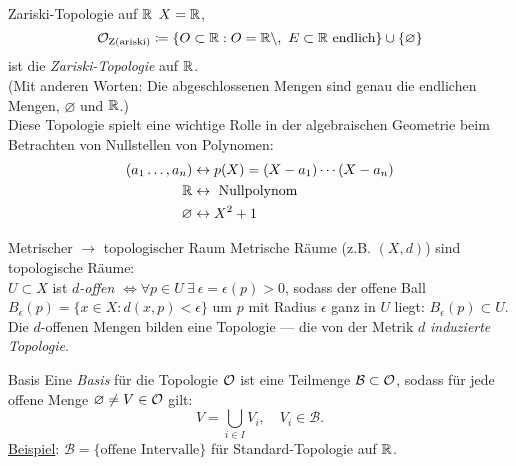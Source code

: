 \begin{example}{Zariski-Topologie auf $ \mathbb{R} $}
  $ X = \mathbb{R} $,
  \begin{equation*}
    \mathcal{O}_\text{Z(ariski)} \coloneqq \{ O \subset \mathbb{R} : O = \mathbb{R} \setminus, \ E \subset \mathbb{R} \text{ endlich} \} \cup \{ \varnothing \}
  \end{equation*}
  ist die \emph{Zariski-Topologie} auf $ \mathbb{R} $. \\
  (Mit anderen Worten: Die abgeschlossenen Mengen sind genau die endlichen Mengen, $ \varnothing $ und $ \mathbb{R} $.) \\
  Diese Topologie spielt eine wichtige Rolle in der algebraischen Geometrie beim Betrachten von Nullstellen von Polynomen: \\
  \begin{align*}
    (a_1 \dots, a_n) &\leftrightarrow p(X) = (X-a_1)\cdots(X-a_n) \\
     \mathbb{R} &\leftrightarrow \text{ Nullpolynom} \\
     \varnothing &\leftrightarrow X^2+1
  \end{align*}
\end{example}

\begin{definition}{Metrischer $ \to $ topologischer Raum}
  Metrische Räume (z.B. $ (X, d) $) sind topologische Räume: \\
  $ U \subset X $ ist \emph{$ d $-offen} $ \Leftrightarrow \forall p \in U \ \exists \ \epsilon = \epsilon(p) > 0 $, sodass der offene Ball $ B_\epsilon(p) = \{ x \in X : d(x,p) < \epsilon \} $ um $ p $ mit Radius $ \epsilon $ ganz in $ U $ liegt: $ B_\epsilon(p) \subset U $. \\
  Die $ d $-offenen Mengen bilden eine Topologie --- die von der Metrik $ d $ \emph{induzierte Topologie}.
\end{definition}

\begin{definition}{Basis}
  Eine \emph{Basis} für die Topologie $ \mathcal{O} $ ist eine Teilmenge $ \mathcal{B} \subset \mathcal{O} $, sodass für jede offene Menge $ \varnothing \neq V \in \mathcal{O} $ gilt:
  \begin{equation*}
    V = \bigcup_{i \in I}V_i, \quad V_i \in \mathcal{B}\text{.}
  \end{equation*}
  \underline{Beispiel}: $ \mathcal{B} = \{ \text{offene Intervalle} \} $ für Standard-Topologie auf $ \mathbb{R} $.
\end{definition}

